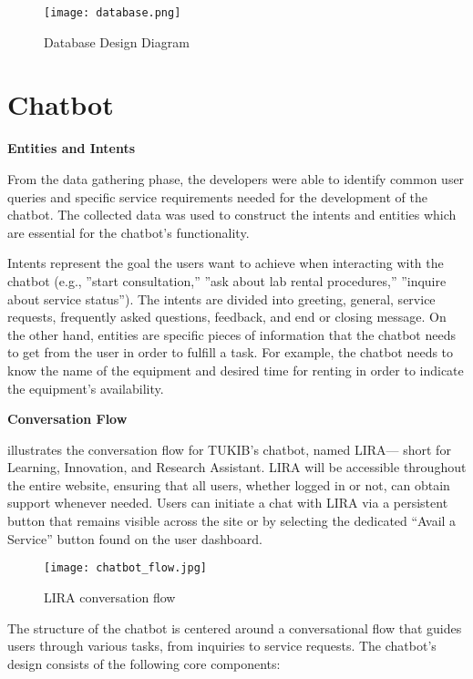 \begin{figure}[h]
	\centering 
	\texttt{[image: database.png]}
	\caption{Database Design Diagram}
	\label{fig:database}
\end{figure}

\newpage

\section{Chatbot}

\textbf{Entities and Intents}

From the data gathering phase, the developers were able to identify common user queries and specific service requirements needed for the development of the chatbot. The collected data was used to construct the intents and entities which are essential for the chatbot’s functionality. 

Intents represent the goal the users want to achieve when interacting with the chatbot (e.g., ”start consultation,” ”ask about lab rental procedures,” ”inquire about service status”). The intents are divided into greeting, general, service requests, frequently asked questions, feedback, and end or closing message. On the other hand, entities are specific pieces of information that the chatbot needs to get from the user in order to fulfill a task. For example, the chatbot needs to know the name of the equipment and desired time for renting in order to indicate the equipment's availability. 

\newpage

\noindent \textbf{Conversation Flow}

 illustrates the conversation flow for TUKIB's chatbot, named LIRA— short for Learning, Innovation, and Research Assistant. LIRA will be accessible throughout the entire website, ensuring that all users, whether logged in or not, can obtain support whenever needed. Users can initiate a chat with LIRA via a persistent button that remains visible across the site or by selecting the dedicated “Avail a Service” button found on the user dashboard.

\begin{figure}[h]
	\centering 
	\texttt{[image: chatbot\_flow.jpg]}
	\caption{LIRA conversation flow}
	\label{fig:chatbot_flow}
\end{figure}

The structure of the chatbot is centered around a conversational flow that guides users through various tasks, from inquiries to service requests. The chatbot’s design consists of the following core components:

